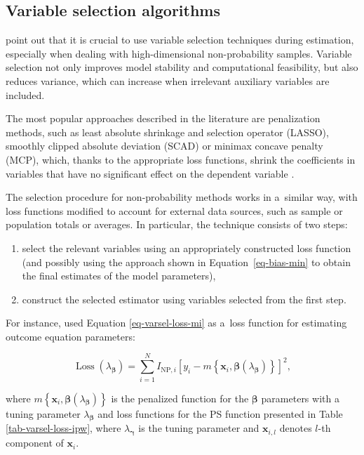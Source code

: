 \documentclass[nojss]{jss}
\begin{document}
\subsection{Variable selection algorithms}\label{sec-varsel}

\citet{yang_asymptotic_2020} point out that it is crucial to use
variable selection techniques during estimation, especially when dealing
with high-dimensional non-probability samples. Variable selection not
only improves model stability and computational feasibility, but also
reduces variance, which can increase when irrelevant auxiliary variables
are included.

The most popular approaches described in the literature are penalization
methods, such as least absolute shrinkage and selection operator
(LASSO), smoothly clipped absolute deviation (SCAD) or minimax concave
penalty (MCP), which, thanks to the appropriate loss functions, shrink
the coefficients in variables that have no significant effect on the
dependent variable \citep[cf.][]{tibshirani1996regression, ncvreg}.

The selection procedure for non-probability methods works in a~similar
way, with loss functions modified to account for external data sources,
such as sample or population totals or averages. In particular, the
technique consists of two steps:

\begin{enumerate}
\item select the relevant variables using an appropriately constructed loss function (and possibly using the approach shown in Equation~\ref{eq-bias-min} to obtain the final estimates of the model parameters),
\item construct the selected estimator using variables selected from the first step. 
\end{enumerate}

For instance, \citet{yang_doubly_2020} used Equation
\ref{eq-varsel-loss-mi} as a~loss function for estimating outcome
equation parameters:

\begin{equation}  
\operatorname{Loss}\left(\lambda_{\boldsymbol{\beta}}\right)=\sum_{i=1}^N I_{\text{NP},i}\left[y_i-m\left\{\boldsymbol{x}_i, \boldsymbol{\beta}(\lambda_{\boldsymbol{\beta}})\right\}\right]^2,
\label{eq-varsel-loss-mi}
\end{equation}

where
\(m\left\{\boldsymbol{x}_i, \boldsymbol{\beta}(\lambda_{\boldsymbol{\beta}})\right\}\)
is the penalized function for the \(\boldsymbol{\beta}\) parameters with
a tuning parameter \(\lambda_{\boldsymbol{\beta}}\) and loss functions
for the PS function presented in Table \ref{tab-varsel-loss-ipw}, where
\(\lambda_{\boldsymbol{\gamma}}\) is the tuning parameter and
\(\boldsymbol{x}_{i,l}\) denotes \(l\)-th component of
\(\boldsymbol{x}_{i}\).
\end{document}
